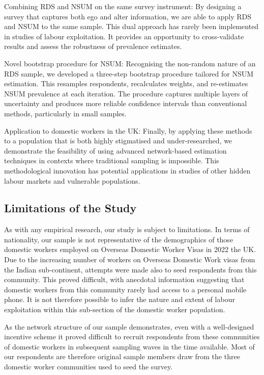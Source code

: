 \documentclass[
  12pt,
  letterpaper,
  DIV=11,
  numbers=noendperiod]{scrartcl}
\theoremstyle{plain}
\theoremstyle{definition}
\begin{document}
Combining RDS and NSUM on the same survey instrument: By designing a
survey that captures both ego and alter information, we are able to
apply RDS and NSUM to the same sample. This dual approach has rarely
been implemented in studies of labour exploitation. It provides an
opportunity to cross-validate results and assess the robustness of
prevalence estimates.

Novel bootstrap procedure for NSUM: Recognising the non-random nature of
an RDS sample, we developed a three-step bootstrap procedure tailored
for NSUM estimation. This resamples respondents, recalculates weights,
and re-estimates NSUM prevalence at each iteration. The procedure
captures multiple layers of uncertainty and produces more reliable
confidence intervals than conventional methods, particularly in small
samples.

Application to domestic workers in the UK: Finally, by applying these
methods to a population that is both highly stigmatised and
under-researched, we demonstrate the feasibility of using advanced
network-based estimation techniques in contexts where traditional
sampling is impossible. This methodological innovation has potential
applications in studies of other hidden labour markets and vulnerable
populations.

\subsection{Limitations of the Study}\label{limitations-of-the-study}

As with any empirical research, our study is subject to limitations. In
terms of nationality, our sample is not representative of the
demographics of those domestic workers employed on Overseas Domestic
Worker Visas in 2022 the UK. Due to the increasing number of workers on
Overseas Domestic Work visas from the Indian sub-continent, attempts
were made also to seed respondents from this community. This proved
difficult, with anecdotal information suggesting that domestic workers
from this community rarely had access to a personal mobile phone. It is
not therefore possible to infer the nature and extent of labour
exploitation within this sub-section of the domestic worker population.

As the network structure of our sample demonstrates, even with a
well-designed incentive scheme it proved difficult to recruit
respondents from these communities of domestic workers in subsequent
sampling waves in the time available. Most of our respondents are
therefore original sample members draw from the three domestic worker
communities used to seed the survey.
\end{document}
